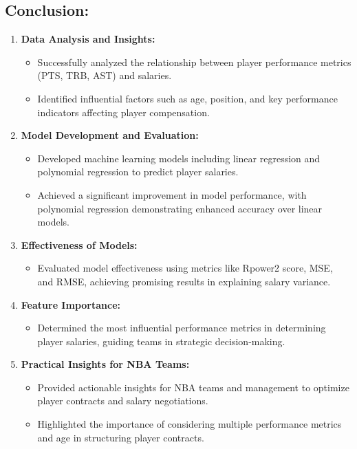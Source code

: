 \documentclass{article}
\begin{document}
\subsection*{\textbf{Conclusion:}}
\begin{enumerate}
    \item \textbf{Data Analysis and Insights:} 
    \begin{itemize}
    \item Successfully analyzed the relationship between player performance metrics (PTS, TRB, AST) and salaries.
    \item Identified influential factors such as age, position, and key performance indicators affecting player compensation.
\end{itemize}
    \item \textbf{Model Development and Evaluation:} \begin{itemize}
    \item Developed machine learning models including linear regression and polynomial regression to predict player salaries.
    \item Achieved a significant improvement in model performance, with polynomial regression demonstrating enhanced accuracy over linear models.
\end{itemize}
    \item \textbf{Effectiveness of Models:} 
    \begin{itemize}
    \item Evaluated model effectiveness using metrics like Rpower2 score, MSE, and RMSE, achieving promising results in explaining salary variance.
\end{itemize}
\item \textbf{Feature Importance:} 
    \begin{itemize}
    \item Determined the most influential performance metrics in determining player salaries, guiding teams in strategic decision-making.
\end{itemize}
\item \textbf{Practical Insights for NBA Teams: } \begin{itemize}
    \item Provided actionable insights for NBA teams and management to optimize player contracts and salary negotiations.
    \item Highlighted the importance of considering multiple performance metrics and age in structuring player contracts.
\end{itemize}

\end{enumerate}
\end{document}
